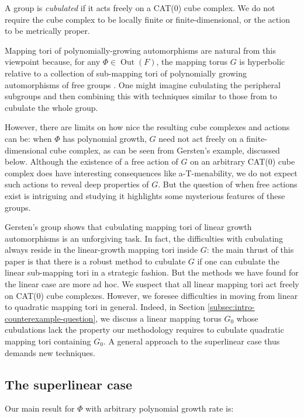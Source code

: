 \documentclass[11pt,oneside]{amsart}
\theoremstyle{definition}
\DeclareMathOperator{\Out}{Out}
\begin{document}
A group is \emph{cubulated} if it acts freely on a CAT(0) cube complex.  We do not require the cube complex to be locally finite or finite-dimensional, or the action to be metrically proper.

Mapping tori of polynomially-growing automorphisms are natural from this viewpoint because, for any $\Phi\in\Out(F)$, the mapping torus $G$ is hyperbolic relative to a collection of sub-mapping tori of polynomially growing automorphisms of free groups \cite{DahmaniLi}.  One might imagine cubulating the peripheral subgroups and then combining this with techniques similar to those from \cite{DahmaniKrishna:irred,DahmaniKrishnaMutanguha} to cubulate the whole group.

However, there are limits on how nice the resulting cube complexes and actions can be: when $\Phi$ has polynomial growth, $G$ need not act freely on a finite-dimensional cube complex, as can be seen from Gersten's example, discussed below.  Although the existence of a free action of $G$ on an arbitrary CAT(0) cube complex does have interesting consequences like a-T-menability, we do not expect such actions to reveal deep properties of $G$. But the question of when free actions exist is intriguing and studying it highlights some mysterious features of these groups.

Gersten's group shows that cubulating mapping tori of linear growth automorphisms is an unforgiving task.  In fact, the difficulties with cubulating always reside in the linear-growth mapping tori inside $G$: the main thrust of this paper is that there is a robust method to cubulate $G$ if one can cubulate the linear sub-mapping tori in a strategic fashion.  But the methods we have found for the linear case are more ad hoc.  We suspect that all linear mapping tori act freely on CAT(0) cube complexes.  However, we foresee difficulties in moving from linear to quadratic mapping tori in general.  Indeed, in Section \ref{subsec:intro-counterexample-question}, we discuss a linear mapping torus $G_0$ whose  cubulations lack the property our methodology requires to cubulate quadratic mapping tori containing $G_0$. A general approach to the superlinear case thus demands new techniques.


\subsection{The superlinear case}\label{subsec:intro-results}
Our main result for $\Phi$ with arbitrary polynomial growth rate is:
\end{document}

